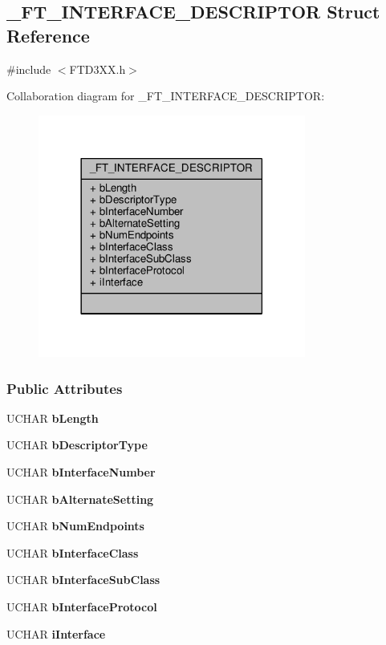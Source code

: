 \subsection{\+\_\+\+F\+T\+\_\+\+I\+N\+T\+E\+R\+F\+A\+C\+E\+\_\+\+D\+E\+S\+C\+R\+I\+P\+T\+OR Struct Reference}
\label{struct__FT__INTERFACE__DESCRIPTOR}


{\ttfamily \#include $<$F\+T\+D3\+X\+X.\+h$>$}



Collaboration diagram for \+\_\+\+F\+T\+\_\+\+I\+N\+T\+E\+R\+F\+A\+C\+E\+\_\+\+D\+E\+S\+C\+R\+I\+P\+T\+OR\+:
\nopagebreak
\begin{figure}[H]
\begin{center}
\leavevmode
\includegraphics[width=249pt]{dc/ddc/struct__FT__INTERFACE__DESCRIPTOR__coll__graph}
\end{center}
\end{figure}
\subsubsection*{Public Attributes}
\begin{DoxyCompactItemize}
\item 
U\+C\+H\+AR {\bf b\+Length}
\item 
U\+C\+H\+AR {\bf b\+Descriptor\+Type}
\item 
U\+C\+H\+AR {\bf b\+Interface\+Number}
\item 
U\+C\+H\+AR {\bf b\+Alternate\+Setting}
\item 
U\+C\+H\+AR {\bf b\+Num\+Endpoints}
\item 
U\+C\+H\+AR {\bf b\+Interface\+Class}
\item 
U\+C\+H\+AR {\bf b\+Interface\+Sub\+Class}
\item 
U\+C\+H\+AR {\bf b\+Interface\+Protocol}
\item 
U\+C\+H\+AR {\bf i\+Interface}
\end{DoxyCompactItemize}


